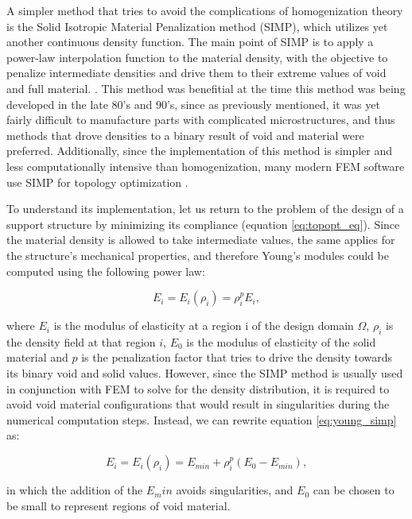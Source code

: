 \documentclass[../main.tex]{subfiles}
\begin{document}
A simpler method that tries to avoid the complications of homogenization theory is the Solid Isotropic Material Penalization method (SIMP), which utilizes yet another continuous density function. The main point of SIMP is to apply a power-law interpolation function to the material density, with the objective to penalize intermediate densities and drive them to their extreme values of void and full material. \cite{bendsoeOptimalShapeDesign1989} \cite{rozvanyGeneralizedShapeOptimization1992}. This method was benefitial at the time this method was being developed in the late 80's and 90's, since as previously mentioned, it was yet fairly difficult to manufacture parts with complicated microstructures, and thus methods that drove densities to a binary result of void and material were preferred. Additionally, since the implementation of this method is simpler and less computationally intensive than homogenization, many modern FEM software use SIMP for topology optimization \cite{SIMPMethodTopologyb}.

To understand its implementation, let us return to the problem of the design of a support structure by minimizing its compliance (equation \ref{eq:topopt_eq}). Since the material density is allowed to take intermediate values, the same applies for the structure's mechanical properties, and therefore Young's modules could be computed using the following power law:

\begin{equation}
  E_i = E_i(\rho_i) = \rho^p_i E_i,
  \label{eq:young_simp}
\end{equation}

where $E_i$ is the modulus of elasticity at a region i of the design domain $\Omega$, $\rho_i$ is the density field at that region $i$, $E_0$ is the modulus of elasticity of the solid material and $p$ is the penalization factor that tries to drive the density towards its binary void and solid values. However, since the SIMP method is usually used in conjunction with FEM to solve for the density distribution, it is required to avoid void material configurations that would result in singularities during the numerical computation steps. Instead, we can rewrite equation \ref{eq:young_simp} as:

\begin{equation}
  E_i = E_i(\rho_i) = E_{min} + \rho_i^p (E_0 - E_{min}),
  \label{eq:simp_modified}
\end{equation}

in which the addition of the $E_min$ avoids singularities, and $E_0$ can be chosen to be small to represent regions of void material.
\end{document}
